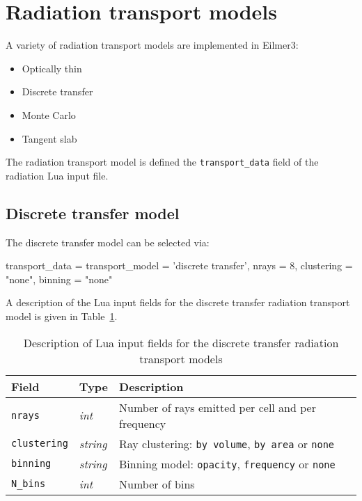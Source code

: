 \section{Radiation transport models}
\label{app:rt-models}

A variety of radiation transport models are implemented in Eilmer3:

\begin{itemize}
 \item Optically thin
 \item Discrete transfer
 \item Monte Carlo
 \item Tangent slab
\end{itemize}

The radiation transport model is defined the \texttt{transport\_data} field of the radiation Lua input file.

\subsection{Discrete transfer model}

The discrete transfer model can be selected via:

\topbar

{
transport_data = {
   transport_model = 'discrete transfer',
   nrays = 8,
   clustering = "none",
   binning = "none"
}
}
\bottombar

A description of the Lua input fields for the discrete transfer radiation transport model is given in Table~\ref {tab:DTM-input}.

\begin{table}
 \begin{center}
  \caption{Description of Lua input fields for the discrete transfer radiation transport models}
  \label{tab:DTM-input}
\begin{tabular}{llp{6cm}}
 \hline \hline
 Field                        & Type              &  Description \\ \hline
\texttt{nrays}            & \textit{int}       &  Number of rays emitted per cell and per frequency \\
\texttt{clustering}    & \textit{string}  &  Ray clustering: \texttt{by volume}, \texttt{by area} or \texttt{none} \\
\texttt{binning}        & \textit{string}  &  Binning model: \texttt{opacity}, \texttt{frequency} or \texttt{none} \\
\texttt{N\_bins}         & \textit{int}       &  Number of bins \\
\hline
\end{tabular}
\end{center}
\end{table}